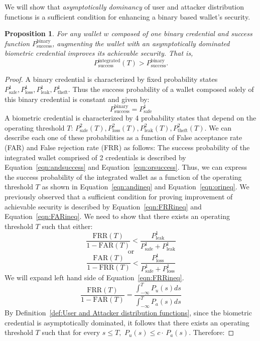 \documentclass[sigconf]{acmart}
\newtheorem{proposition}{Proposition}
\theoremstyle{definition}
\begin{document}
We will show that \emph{asymptotically dominancy} of user and attacker distribution functions is a sufficient condition for enhancing a binary based wallet's security.

\begin{proposition}
\label{thm:biometric-improves-security}
For any wallet $w$ composed of one binary credential and success function $P^{\text{binary}}_{\text{success}}$, augmenting the wallet with an asymptotically dominated biometric credential improves its achievable security. That is,
\[
P^{\text{integrated}}_{\text{success}}(T) > P^{\text{binary}}_{\text{success}} .
\]
\end{proposition}

\begin{proof}
A binary credential is characterized by fixed probability states $P^{1}_{\text{safe}}, P^{1}_{\text{loss}}, P^{1}_{\text{leak}}, P^{1}_{\text{theft}}$. Thus the success probability of a wallet composed solely of this binary credential is constant and given by: 
\[P^{\text{binary}}_{\text{success}} = 
P^{1}_{\text{safe}}
\]
A biometric credential is characterized by 4 probability states that depend on the operating threshold $T$: $P^{2}_{\text{safe}}(T), P^{2}_{\text{loss}}(T), P^{2}_{\text{leak}}(T), P^{2}_{\text{theft}}(T)$. We can describe each one of these probabilities as a function of False acceptance rate (FAR) and False rejection rate (FRR) as follows:
\contprobabilities
The success probability of the integrated wallet comprised of 2 credentials is described by Equation~\ref{eqn:andsuccess} and Equation~\ref{eqn:orsuccess}. Thus, we can express the success probability of the integrated wallet as a function of the operating threshold $T$ as shown in Equation~\ref{eqn:andineq} and Equation~\ref{eqn:orineq}. We previously observed that a sufficient condition for proving improvement of achievable security is described by Equation~\ref{eqn:FRRineq} and Equation~\ref{eqn:FARineq}. We need to show that there exists an operating threshold $T$ such that either:
\[\frac{\mathrm{FRR}(T)}{1-\mathrm{FAR}(T)} < \frac{P^{1}_{\text{leak}}}{P^{1}_{\text{safe}}+P^{1}_{\text{leak}}}\]
\[\quad\text{or}\quad\] 
\[
    \frac{\mathrm{FAR}(T)}{1-\mathrm{FRR}(T)} < \frac{P^{1}_{\text{loss}}}{P^{1}_{\text{safe}}+P^{1}_{\text{loss}}}
\]
We will expand left hand side of Equation~\ref{eqn:FRRineq}. 
\[
\frac{\mathrm{FRR}(T)}{1-\mathrm{FAR}(T)} = \frac{\int_{-\infty}^{T} P_u(s) ds}{\int_{-\infty}^{T} P_a(s) ds}
\]
By Definition~\ref{def:User and Attacker distribution functions}, since the biometric credential is asymptotically dominated, it follows that there exists an operating threshold $T$ such that for every $s \le T,$ $P_u(s) \le c\cdot\,P_a(s)$. Therefore:

\end{proof}
\end{document}
